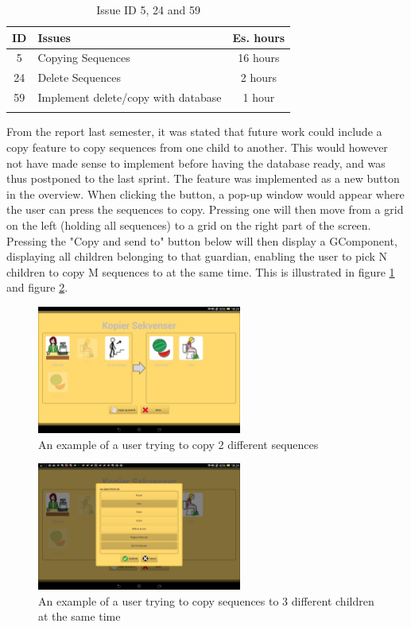 \begin{longtable} { | c | p{12cm} | c | } 
\hline
	ID 	&	Issues	&		 Es. hours \\\hline
	5	&	Copying Sequences	&	16 hours	\\\hline
	24	& 	Delete Sequences	&	2 hours \\\hline
	59  	&	Implement delete/copy with database	&	1 hour \\\hline
\caption{Issue ID 5, 24 and 59}
\label{tab:spr4_copyingsequences}
\end{longtable}

From the report last semester, it was stated that future work could include a copy feature to copy sequences from one child to another. This would however not have made sense to implement before having the database ready, and was thus postponed to the last sprint. The feature was implemented as a new button in the overview. When clicking the button, a pop-up window would appear where the user can press the sequences to copy. Pressing one will then move from a grid on the left (holding all sequences) to a grid on the right part of the screen. Pressing the "Copy and send to" button below will then display a GComponent, displaying all children belonging to that guardian, enabling the user to pick N children to copy M sequences to at the same time. This is illustrated in figure \ref{fig:copyDialog} and figure \ref{fig:profilesList}.

\begin{figure} [h!]
\centering
\includegraphics[width=0.6\textwidth]{Pics/Sprint4/copyPasteDialog/copy}
\caption{An example of a user trying to copy 2 different sequences}
\label{fig:copyDialog}
\end{figure}
\begin{figure} [h!]
\centering
\includegraphics[width=0.6\textwidth]{Pics/Sprint4/copyPasteDialog/profilelist}
\caption{An example of a user trying to copy sequences to 3 different children at the same time}
\label{fig:profilesList}
\end{figure}

